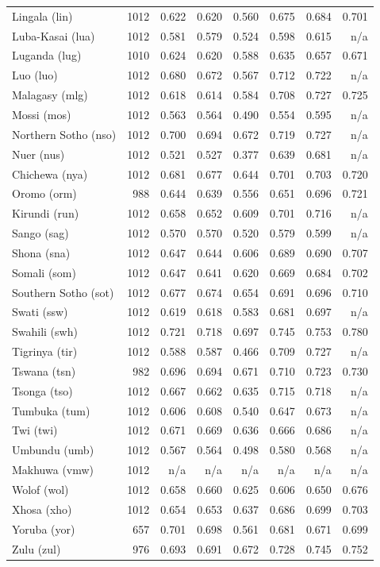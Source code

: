 {\begin{longtable}[]{@{}lrrrrrrr@{}}
Lingala (lin) & 1012 & 0.622 & 0.620 & 0.560 & 0.675 & 0.684 & 0.701 \\
Luba-Kasai (lua) & 1012 & 0.581 & 0.579 & 0.524 & 0.598 & 0.615 & n/a \\
Luganda (lug) & 1010 & 0.624 & 0.620 & 0.588 & 0.635 & 0.657 & 0.671 \\
Luo (luo) & 1012 & 0.680 & 0.672 & 0.567 & 0.712 & 0.722 & n/a \\
Malagasy (mlg) & 1012 & 0.618 & 0.614 & 0.584 & 0.708 & 0.727 & 0.725 \\
Mossi (mos) & 1012 & 0.563 & 0.564 & 0.490 & 0.554 & 0.595 & n/a \\
Northern Sotho (nso) & 1012 & 0.700 & 0.694 & 0.672 & 0.719 & 0.727 & n/a \\
Nuer (nus) & 1012 & 0.521 & 0.527 & 0.377 & 0.639 & 0.681 & n/a \\
Chichewa (nya) & 1012 & 0.681 & 0.677 & 0.644 & 0.701 & 0.703 & 0.720 \\
Oromo (orm) & 988 & 0.644 & 0.639 & 0.556 & 0.651 & 0.696 & 0.721 \\
Kirundi (run) & 1012 & 0.658 & 0.652 & 0.609 & 0.701 & 0.716 & n/a \\
Sango (sag) & 1012 & 0.570 & 0.570 & 0.520 & 0.579 & 0.599 & n/a \\
Shona (sna) & 1012 & 0.647 & 0.644 & 0.606 & 0.689 & 0.690 & 0.707 \\
Somali (som) & 1012 & 0.647 & 0.641 & 0.620 & 0.669 & 0.684 & 0.702 \\
Southern Sotho (sot) & 1012 & 0.677 & 0.674 & 0.654 & 0.691 & 0.696 & 0.710 \\
Swati (ssw) & 1012 & 0.619 & 0.618 & 0.583 & 0.681 & 0.697 & n/a \\
Swahili (swh) & 1012 & 0.721 & 0.718 & 0.697 & 0.745 & 0.753 & 0.780 \\
Tigrinya (tir) & 1012 & 0.588 & 0.587 & 0.466 & 0.709 & 0.727 & n/a \\
Tswana (tsn) & 982 & 0.696 & 0.694 & 0.671 & 0.710 & 0.723 & 0.730 \\
Tsonga (tso) & 1012 & 0.667 & 0.662 & 0.635 & 0.715 & 0.718 & n/a \\
Tumbuka (tum) & 1012 & 0.606 & 0.608 & 0.540 & 0.647 & 0.673 & n/a \\
Twi (twi) & 1012 & 0.671 & 0.669 & 0.636 & 0.666 & 0.686 & n/a \\
Umbundu (umb) & 1012 & 0.567 & 0.564 & 0.498 & 0.580 & 0.568 & n/a \\
Makhuwa (vmw) & 1012 & n/a & n/a & n/a & n/a & n/a & n/a \\
Wolof (wol) & 1012 & 0.658 & 0.660 & 0.625 & 0.606 & 0.650 & 0.676 \\
Xhosa (xho) & 1012 & 0.654 & 0.653 & 0.637 & 0.686 & 0.699 & 0.703 \\
Yoruba (yor) & 657 & 0.701 & 0.698 & 0.561 & 0.681 & 0.671 & 0.699 \\
Zulu (zul) & 976 & 0.693 & 0.691 & 0.672 & 0.728 & 0.745 & 0.752 \\
\end{longtable}
}

